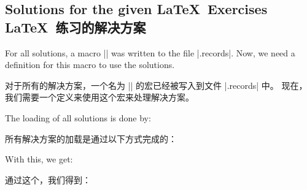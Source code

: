 \subsection{Solutions for the given \LaTeX\ Exercises\\\LaTeX\ 练习的解决方案}

For all solutions, a macro |\processsol| was written to the file |\jobname.records|.
Now, we need a definition for this macro to use the solutions.

对于所有的解决方案，一个名为 |\processsol| 的宏已经被写入到文件 |\jobname.records| 中。 现在，我们需要一个定义来使用这个宏来处理解决方案。
\tcbusetemp

The loading of all solutions is done by:

所有解决方案的加载是通过以下方式完成的：

\begin{dispListing}
\tcbinputrecords
\end{dispListing}

With this, we get:

通过这个，我们得到：

\tcbusetemp



